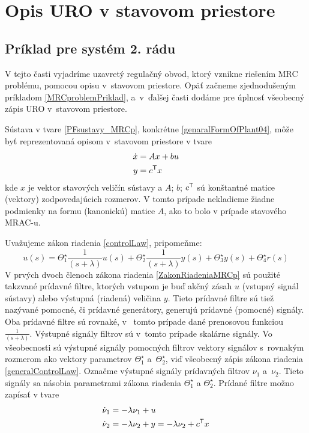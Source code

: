 \documentclass[a4paper, 10pt, ]{article}
\begin{document}
\section{Opis URO v stavovom priestore}

\subsection{Príklad pre systém 2. rádu}

V tejto časti vyjadríme uzavretý regulačný obvod, ktorý vznikne riešením MRC problému, pomocou opisu v~stavovom priestore. Opäť začneme zjednodušeným príkladom \ref{MRCproblemPriklad}, a~v~ďalšej časti dodáme pre úplnosť všeobecný zápis URO v~stavovom priestore.

Sústava v tvare \eqref{PFsustavy_MRCp}, konkrétne \eqref{genaralFormOfPlant04}, môže byť reprezentovaná opisom v~stavovom priestore v tvare
\begin{subequations}
	\begin{align}
		 \dot x &= A x + b u \\
		 y &= c^{\mathsf{T}} x
	\end{align}
\end{subequations}
kde $x$ je vektor stavových veličín sústavy a $A$; $b$; $c^{\mathsf{T}}$ sú konštantné matice (vektory) zodpovedajúcich rozmerov. V tomto prípade nekladieme žiadne podmienky na formu (kanonickú) matice $A$, ako to bolo v prípade stavového MRAC-u.

Uvažujeme zákon riadenia \eqref{controlLaw}, pripomeňme:
\begin{equation} \label{ZakonRiadeniaMRCp}
	u(s) = \Theta_1^\star \frac{1}{(s + \lambda)} u(s) + \Theta_2^\star \frac{1}{(s + \lambda)} y(s) + \Theta_3^\star y(s) + \Theta_4^\star r(s)
\end{equation}
V prvých dvoch členoch zákona riadenia \eqref{ZakonRiadeniaMRCp} sú použité takzvané prídavné filtre, ktorých vstupom je buď akčný zásah $u$ (vstupný signál sústavy) alebo výstupná (riadená) veličina $y$. Tieto prídavné filtre sú tiež nazývané pomocné, či prídavné generátory, generujú prídavné (pomocné) signály. Oba prídavné filtre sú rovnaké, v~ tomto prípade dané prenosovou funkciou $\frac{1}{(s + \lambda)}$. Výstupné signály filtrov sú v~tomto prípade skalárne signály. Vo všeobecnosti sú výstupné signály pomocných filtrov vektory signálov s~rovnakým rozmerom ako vektory parametrov $\Theta_1^\star$ a~$\Theta_2^\star$, viď všeobecný zápis zákona riadenia \eqref{generalControlLaw}. Označme výstupné signály prídavných filtrov $\nu_1$ a~$\nu_2$. Tieto signály sa násobia parametrami zákona riadenia ${{\Theta}_1^\star}$ a ${{\Theta}_2^\star}$. Prídané filtre možno zapísať v tvare
\begin{subequations}
	\begin{align}
		 \dot \nu_1 &= -\lambda \nu_1 + u \\
		 \dot \nu_2 &= -\lambda \nu_2 + y = -\lambda \nu_2 + c^{\mathsf{T}} x
	\end{align}
\end{subequations}
\end{document}
